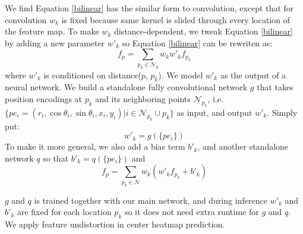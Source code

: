 \documentclass{article}
\begin{document}
We find Equation \ref{bilinear} has the similar form to convolution, except that for convolution $w_k$ is fixed because same kernel is slided through every location of the feature map. To make $w_k$ distance-dependent, we tweak Equation \ref{bilinear} by adding a new parameter $w'_{k}$ so Equation \ref{bilinear} can be rewriten as:
\vspace{-1mm}\begin{equation}
\label{conv}
    f_p = \sum_{p_k \in \mathcal{N}_p} w_k  w'_k  f_{p_k} 
\end{equation}
where $w'_k$ is conditioned on distance($p$, $p_k$). We model $w'_k$ as the output of a neural network. We build a standalone fully convolutional network $g$ that takes position encodings at $p_k$ and its neighboring points $\mathcal{N}_{p_k}$, i.e. $ \{pe_i = (r_i, \cos \theta_i, \sin \theta_i, x_i, y_i) | i \in \mathcal{N}_{p_k} \cup p_k\}$ as input, and output $w'_k$. Simply put:
\vspace{-1.5mm}\begin{equation}
    w'_k = g(\{pe_i\})
\end{equation}
To make it more general, we also add a bias term $b'_k$, and another standalone network $q$ so that $b'_k = q(\{pe_i\})$ and 
\begin{equation}
    f_p = \sum_{p_k \in \mathcal{N}} w_k  (w'_k f_{p_k} + b'_k)
\end{equation}\vspace{-1mm}

$g$ and $q$ is trained together with our main network, and during inference $w'_k$ and $b'_k$ are fixed for each location $p_k$ so it does not need extra runtime for $g$ and $q$. We apply feature undistortion in center heatmap prediction.
\end{document}
